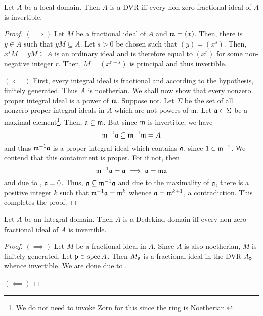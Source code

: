 \begin{proposition}
    Let $A$ be a local domain. Then $A$ is a DVR iff every non-zero fractional ideal of $A$ is invertible.
\end{proposition}
\begin{proof}
    $(\implies)$ Let $M$ be a fractional ideal of $A$ and $\mathfrak m = (x)$. Then, there is $y\in A$ such that $yM\subseteq A$. Let $s > 0$ be chosen such that $(y) = (x^s)$. Then, $x^sM = yM\subseteq A$ is an ordinary ideal and is therefore equal to $(x^r)$ for some non-negative integer $r$. Then, $M = (x^{r - s})$ is principal and thus invertible. 

    $(\impliedby)$ First, every integral ideal is fractional and according to the hypothesis, finitely generated. Thus $A$ is noetherian. We shall now show that every nonzero proper integral ideal is a power of $\mathfrak m$. Suppose not. Let $\Sigma$ be the set of all nonzero proper integral ideals in $A$ which are not powers of $\mathfrak m$. Let $\mathfrak a\in\Sigma$ be a maximal element\footnote{We do not need to invoke Zorn for this since the ring is Noetherian.}. Then, $\mathfrak a\subsetneq\mathfrak m$. But since $\mathfrak m$ is invertible, we have 
    \begin{equation*}
        \mathfrak m^{-1}\mathfrak a\subseteq\mathfrak m^{-1}\mathfrak m = A
    \end{equation*}
    and thus $\mathfrak m^{-1}\mathfrak a$ is a proper integral ideal which contains $\mathfrak a$, since $1\in\mathfrak m^{-1}$. We contend that this containment is proper. For if not, then 
    \begin{equation*}
        \mathfrak m^{-1}\mathfrak a = \mathfrak a\implies\mathfrak a = \mathfrak m\mathfrak a
    \end{equation*}
    and due to , $\mathfrak a = 0$. Thus, $\mathfrak a\subsetneq\mathfrak m^{-1}\mathfrak a$ and due to the maximality of $\mathfrak a$, there is a positive integer $k$ such that $\mathfrak m^{-1}\mathfrak a = \mathfrak m^k$ whence $\mathfrak a = \mathfrak m^{k + 1}$, a contradiction. This completes the proof.
\end{proof}

\begin{proposition}
    Let $A$ be an integral domain. Then $A$ is a Dedekind domain iff every non-zero fractional ideal of $A$ is invertible.
\end{proposition}
\begin{proof}
    $(\implies)$ Let $M$ be a fractional ideal in $A$. Since $A$ is also noetherian, $M$ is finitely generated. Let $\mathfrak p\in\operatorname{spec} A$. Then $M_\mathfrak p$ is a fractional ideal in the DVR $A_\mathfrak p$ whence invertible. We are done due to .

    $(\impliedby)$ 
\end{proof}

